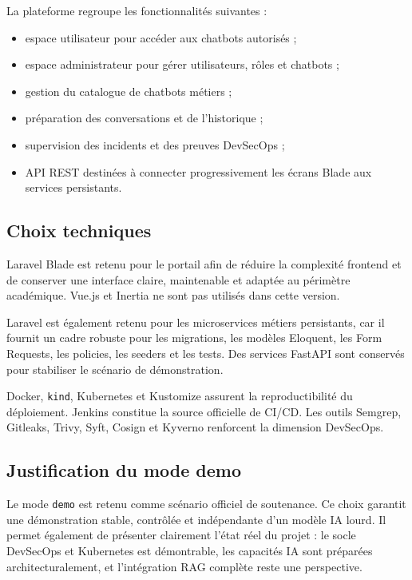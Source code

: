 La plateforme regroupe les fonctionnalités suivantes :

\begin{itemize}
    \item espace utilisateur pour accéder aux chatbots autorisés ;
    \item espace administrateur pour gérer utilisateurs, rôles et chatbots ;
    \item gestion du catalogue de chatbots métiers ;
    \item préparation des conversations et de l'historique ;
    \item supervision des incidents et des preuves DevSecOps ;
    \item API REST destinées à connecter progressivement les écrans Blade aux services persistants.
\end{itemize}

\subsection{Choix techniques}

Laravel Blade est retenu pour le portail afin de réduire la complexité frontend et de conserver une interface claire, maintenable et adaptée au périmètre académique. Vue.js et Inertia ne sont pas utilisés dans cette version.

Laravel est également retenu pour les microservices métiers persistants, car il fournit un cadre robuste pour les migrations, les modèles Eloquent, les Form Requests, les policies, les seeders et les tests. Des services FastAPI sont conservés pour stabiliser le scénario de démonstration.

Docker, \texttt{kind}, Kubernetes et Kustomize assurent la reproductibilité du déploiement. Jenkins constitue la source officielle de CI/CD. Les outils Semgrep, Gitleaks, Trivy, Syft, Cosign et Kyverno renforcent la dimension DevSecOps.

\subsection{Justification du mode demo}

Le mode \texttt{demo} est retenu comme scénario officiel de soutenance. Ce choix garantit une démonstration stable, contrôlée et indépendante d'un modèle IA lourd. Il permet également de présenter clairement l'état réel du projet : le socle DevSecOps et Kubernetes est démontrable, les capacités IA sont préparées architecturalement, et l'intégration RAG complète reste une perspective.

